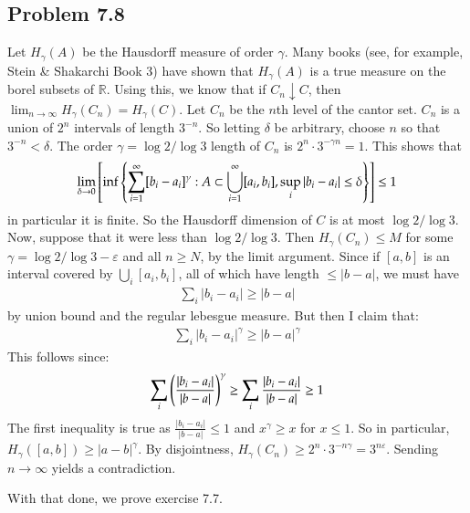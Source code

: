 \documentclass[12pt]{article}
\theoremstyle{definitionstyle}
\def\mbb#1{\mathbb{#1}}
\def\R{\mbb{R}}
\def\ve{\varepsilon}
\newcommand{\1}{\mathds 1}
\begin{document}
    \subsection*{Problem 7.8}
    Let $H_\gamma(A)$ be the Hausdorff measure of order $\gamma$. Many books (see, for example, Stein \& Shakarchi Book 3) have shown that $H_\gamma(A)$ is a true measure on the borel subsets of $\R$. Using this, we know that if $C_n \downarrow C$, then $\lim_{n \to \infty} H_\gamma(C_n) = H_\gamma(C)$. Let $C_n$ be the $n$th level of the cantor set. $C_n$ is a union of $2^n$ intervals of length $3^{-n}$. So letting $\delta$ be arbitrary, choose $n$ so that $3^{-n} < \delta$. The order $\gamma = \log 2 / \log 3$ length of $C_n$ is $2^n \cdot 3^{- \gamma n} = 1$. This shows that 
    \begin{align*}
        \lim_{\delta \to 0} \qty[\inf\qty{\sum_{i=1}^\infty [b_i-a_i]^\gamma : A \subset \bigcup_{i=1}^\infty [a_i,b_i], \sup_i |b_i-a_i| \leq \delta}] \leq 1
    \end{align*} in particular it is finite. So the Hausdorff dimension of $C$ is at most $\log 2 / \log 3$. Now, suppose that it were less than $\log 2 / \log 3$. Then $H_\gamma(C_n) \leq M$ for some $\gamma = \log 2 / \log 3 - \ve$ and all $n \geq N$, by the limit argument. Since if $[a,b]$ is an interval covered by $\bigcup_i [a_i,b_i]$, all of which have length $\leq |b-a|$, we must have 
    \begin{align*}
        \sum_i |b_i-a_i| \geq |b-a|
    \end{align*} by union bound and the regular lebesgue measure. But then I claim that:
    \begin{align*}
        \sum_i |b_i-a_i|^{\gamma} \geq |b-a|^{\gamma}
    \end{align*} 
    This follows since:
    \begin{align*}
        \sum_i \qty(\frac{|b_i-a_i|}{|b-a|})^{\gamma} \geq \sum_i \frac{|b_i-a_i|}{|b-a|} \geq 1
    \end{align*}
    The first inequality is true as $\frac{|b_i-a_i|}{|b-a|} \leq 1$ and $x^\gamma \geq x$ for $x \leq 1$. So in particular, $H_\gamma([a,b]) \geq |a-b|^\gamma$. By disjointness, $H_\gamma(C_n) \geq 2^n \cdot 3^{-n \gamma} = 3^{n \ve}$. Sending $n \to \infty$ yields a contradiction.

    With that done, we prove exercise 7.7.
\end{document}
